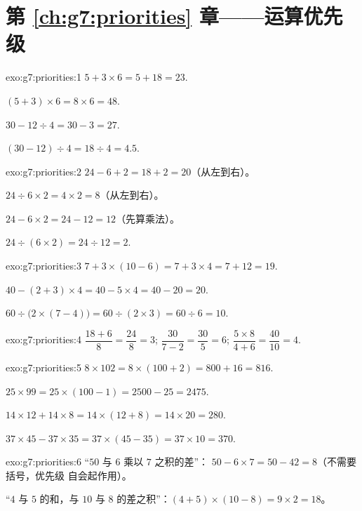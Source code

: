 \section*{第 \ref{ch:g7:priorities} 章——运算优先级}

\begin{solution}{exo:g7:priorities:1}
$5 + 3 \times 6 = 5 + 18 = 23$.

$(5 + 3) \times 6 = 8 \times 6 = 48$.

$30 - 12 \div 4 = 30 - 3 = 27$.

$(30 - 12) \div 4 = 18 \div 4 = 4.5$.
\end{solution}

\begin{solution}{exo:g7:priorities:2}
$24 - 6 + 2 = 18 + 2 = 20$（从左到右）。

$24 \div 6 \times 2 = 4 \times 2 = 8$（从左到右）。

$24 - 6 \times 2 = 24 - 12 = 12$（先算乘法）。

$24 \div (6 \times 2) = 24 \div 12 = 2$.
\end{solution}

\begin{solution}{exo:g7:priorities:3}
$7 + 3 \times (10 - 6) = 7 + 3 \times 4 = 7 + 12 = 19$.

$40 - (2 + 3) \times 4 = 40 - 5 \times 4 = 40 - 20 = 20$.

$60 \div \bigl(2 \times (7 - 4)\bigr) = 60 \div (2 \times 3)
= 60 \div 6 = 10$.
\end{solution}

\begin{solution}{exo:g7:priorities:4}
$\dfrac{18 + 6}{8} = \dfrac{24}{8} = 3$; \quad
$\dfrac{30}{7 - 2} = \dfrac{30}{5} = 6$; \quad
$\dfrac{5 \times 8}{4 + 6} = \dfrac{40}{10} = 4$.
\end{solution}

\begin{solution}{exo:g7:priorities:5}
$8 \times 102 = 8 \times (100 + 2) = 800 + 16 = 816$.

$25 \times 99 = 25 \times (100 - 1) = 2500 - 25 = 2475$.

$14 \times 12 + 14 \times 8 = 14 \times (12 + 8) = 14 \times 20 = 280$.

$37 \times 45 - 37 \times 35 = 37 \times (45 - 35) = 37 \times 10 =
370$.
\end{solution}

\begin{solution}{exo:g7:priorities:6}
“$50$ 与 $6$ 乘以 $7$ 之积的差”：
$50 - 6 \times 7 = 50 - 42 = 8$（不需要括号，优先级
自会起作用）。

“$4$ 与 $5$ 的和，与 $10$ 与
$8$ 的差之积”：$(4 + 5) \times (10 - 8) = 9 \times 2 = 18$。
\end{solution}


